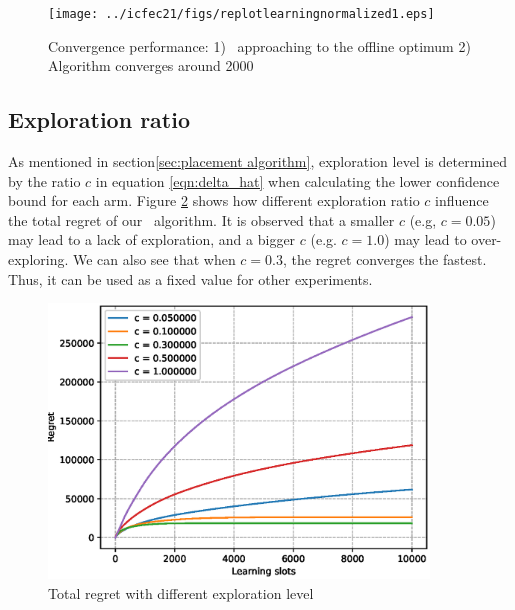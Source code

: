 \begin{figure}
	\centering
	\texttt{[image: ../icfec21/figs/replotlearningnormalized1.eps]}
		\vspace{\baselineskip}
	\caption{Convergence performance: 1) \myalgorithm\ approaching to the offline optimum 2) Algorithm converges around 2000 }
	\label{fig:Convergence performance}
\end{figure}

\subsection{Exploration ratio}
\label{eval:explorationratio}
As mentioned in section\ref{sec:placement algorithm}, exploration level is determined by the ratio $c$ in equation \ref{eqn:delta_hat} when calculating the lower confidence bound for each arm. 
Figure \ref{fig:exploratio} shows how different exploration ratio $c$ influence the total regret of our \myalgorithm\ algorithm. It is observed that a smaller $c$ (e.g, $c = 0.05$) may lead to a lack of exploration, and a bigger $c$ (e.g. $c=1.0$) may lead to over-exploring. We can also see that when $c = 0.3$, the regret converges the fastest. Thus,  it can be used as a fixed value for other experiments. 




\begin{figure}
	\centering
	\includegraphics[width=0.9\textwidth]{figs/replotregret1.eps}
		\vspace{\baselineskip}
	\caption{Total regret with different exploration level}
	\label{fig:exploratio}
\end{figure}

